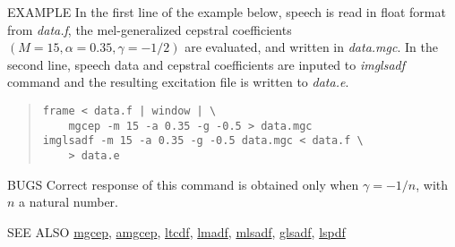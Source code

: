 \begin{options}
\end{options}

\begin{qsection}{EXAMPLE}
In the first line of the example below, 
speech is read in float format from {\em data.f},
the mel-generalized cepstral coefficients $(M=15,\alpha=0.35,\gamma=-1/2)$
are evaluated, and written in {\em data.mgc}.
In the second line,
speech data and cepstral coefficients are
inputed to {\em imglsadf} command and the resulting excitation file
is written to {\em data.e}.
\begin{quote}
 \verb!frame < data.f | window | \!\\
 \verb!    mgcep -m 15 -a 0.35 -g -0.5 > data.mgc!\\
 \verb!imglsadf -m 15 -a 0.35 -g -0.5 data.mgc < data.f \!\\
 \verb!    > data.e!
\end{quote} 
\end{qsection}

\begin{qsection}{BUGS}
Correct response of this command is obtained only when
$\gamma = -1/n$, with $n$ a natural number.
\end{qsection}

\begin{qsection}{SEE ALSO}
\hyperlink{mgcep}{mgcep},
\hyperlink{amgcep}{amgcep},
\hyperlink{ltcdf}{ltcdf},
\hyperlink{lmadf}{lmadf},
\hyperlink{mlsadf}{mlsadf},
\hyperlink{glsadf}{glsadf},
\hyperlink{lspdf}{lspdf}
\end{qsection}
